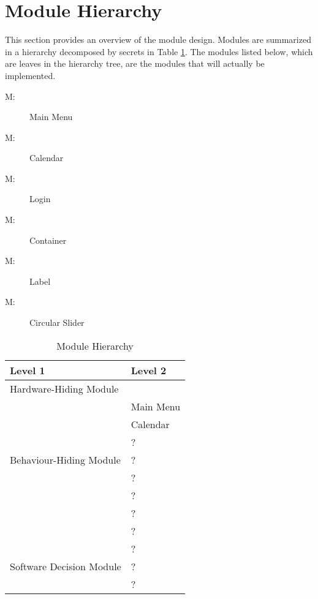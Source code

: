\documentclass[12pt, titlepage]{article}
\newcounter{mnum}
\newcommand{\mthemnum}{M\themnum}
\begin{document}
\section{Module Hierarchy} \label{SecMH}

This section provides an overview of the module design. Modules are summarized
in a hierarchy decomposed by secrets in Table \ref{TblMH}. The modules listed
below, which are leaves in the hierarchy tree, are the modules that will
actually be implemented.

\begin{description}
	\item [ \mthemnum \label{m1}:] Main Menu
	\item [ \mthemnum \label{m2}:] Calendar
	\item [ \mthemnum \label{m3}:] Login
	\item [ \mthemnum \label{m4}:] Container
	\item [ \mthemnum \label{m5}:] Label
	\item [ \mthemnum \label{m6}:] Circular Slider
\end{description}


\begin{table}[h!]
	\centering
	\begin{tabular}{p{} p{}}
		\toprule
		\textbf{Level 1} & \textbf{Level 2}\\
		\midrule
		
		{Hardware-Hiding Module} & ~ \\
		\midrule
		
		\multirow{7}{0.3\textwidth}{Behaviour-Hiding Module} & Main Menu\\
		& Calendar\\
		& ?\\
		& ?\\
		& ?\\
		& ?\\
		& ?\\ 
		& ?\\
		\midrule
		
		\multirow{3}{0.3\textwidth}{Software Decision Module} & {?}\\
		& ?\\
		& ?\\
		\bottomrule
		
	\end{tabular}
	\caption{Module Hierarchy}
	\label{TblMH}
\end{table}
\end{document}
